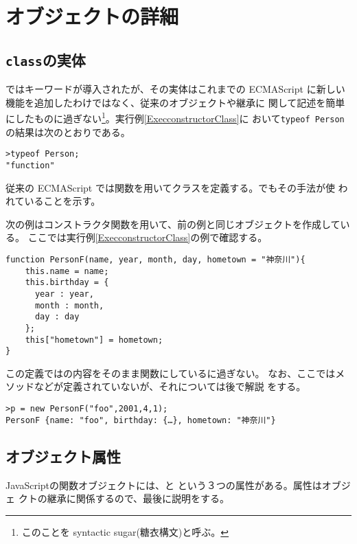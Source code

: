 \chapter{オブジェクトの詳細}
\section{\protect\texttt{class}の実体}
\ES ではキーワードが導入されたが、その実体はこれまでの
ECMAScript に新しい機能を追加したわけではなく、従来のオブジェクトや継承に
関して記述を簡単にしたものに過ぎない\footnote{このことを syntactic
sugar(糖衣構文)と呼ぶ。}。実行例\ref{ExecconstructorClass}に
おいて\texttt{typeof Person}の結果は次のとおりである。
\begin{Verbatim}
>typeof Person;
"function"
\end{Verbatim}
従来の ECMAScript では関数を用いてクラスを定義する。でもその手法が使
われていることを示す。
\begin{Exec}\label{constructor}\upshape
次の例はコンストラクタ関数を用いて、前の例と同じオブジェクトを作成している。
%
ここでは実行例\ref{ExecconstructorClass}の例で確認する。
\begin{Verbatim}
function PersonF(name, year, month, day, hometown = "神奈川"){
    this.name = name;
    this.birthday = {
      year : year,
      month : month,
      day : day
    };
    this["hometown"] = hometown;
}
\end{Verbatim}
 この定義ではの内容をそのまま関数にしているに過ぎない。
 なお、ここではメソッドなどが定義されていないが、それについては後で解説
 をする。
 \end{Exec}
\begin{Verbatim}
>p = new PersonF("foo",2001,4,1);
PersonF {name: "foo", birthday: {…}, hometown: "神奈川"}
\end{Verbatim}
\section{オブジェクト属性}
JavaScriptの関数オブジェクトには、と
という３つの属性がある。属性はオブジェ
クトの継承に関係するので、最後に説明をする。
